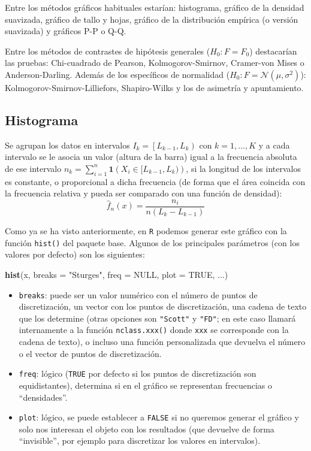 \documentclass[
]{book}
\newenvironment{Shaded}{\begin{snugshade}}{\end{snugshade}}
\newcommand{\DataTypeTok}[1]{\textcolor[rgb]{0.13,0.29,0.53}{#1}}
\newcommand{\KeywordTok}[1]{\textcolor[rgb]{0.13,0.29,0.53}{\textbf{#1}}}
\newcommand{\NormalTok}[1]{#1}
\newcommand{\OtherTok}[1]{\textcolor[rgb]{0.56,0.35,0.01}{#1}}
\newcommand{\StringTok}[1]{\textcolor[rgb]{0.31,0.60,0.02}{#1}}
\theoremstyle{break}
\theoremstyle{definition}
\theoremstyle{definition}
\theoremstyle{definition}
\theoremstyle{remark}
\begin{document}
Entre los métodos gráficos habituales estarían: histograma, gráfico de la densidad suavizada, gráfico de tallo y hojas, gráfico de la distribución empírica (o versión suavizada) y gráficos P-P o Q-Q.

Entre los métodos de contrastes de hipótesis generales (\(H_0:F=F_0\)) destacarían las pruebas: Chi-cuadrado de Pearson, Kolmogorov-Smirnov, Cramer-von Mises o Anderson-Darling.
Además de los específicos de normalidad (\(H_0:F= \mathcal{N}(\mu,\sigma^2)\)): Kolmogorov-Smirnov-Lilliefors, Shapiro-Wilks y los de asimetría y apuntamiento.

\hypertarget{histograma}{%
\subsection{Histograma}\label{histograma}}

Se agrupan los datos en intervalos \(I_{k}=\left[ L_{k-1},L_{k}\right)\) con \(k=1, \ldots, K\) y a cada intervalo se le asocia un valor (altura de la barra) igual a la frecuencia absoluta de ese intervalo \(n_k = \sum_{i=1}^{n}\mathbf{1}\left( X_i \in [L_{k-1},L_{k}) \right)\), si la longitud de los intervalos es constante, o proporcional a dicha frecuencia (de forma que el área coincida con la frecuencia relativa y pueda ser comparado con una función de densidad):
\[\hat{f}_n(x)=\frac{n_{i}}{n\left(  L_{k}-L_{k-1}\right)}\]

Como ya se ha visto anteriormente, en \texttt{R} podemos generar este gráfico con la función \texttt{hist()} del paquete base.
Algunos de los principales parámetros (con los valores por defecto) son los siguientes:

\begin{Shaded}
\begin{Highlighting}[]
\KeywordTok{hist}\NormalTok{(x, }\DataTypeTok{breaks =} \StringTok{"Sturges"}\NormalTok{, }\DataTypeTok{freq =} \OtherTok{NULL}\NormalTok{, }\DataTypeTok{plot =} \OtherTok{TRUE}\NormalTok{, ...)}
\end{Highlighting}
\end{Shaded}

\begin{itemize}
\item
  \texttt{breaks}: puede ser un valor numérico con el número de puntos de discretización, un vector con los puntos de discretización, una cadena de texto que los determine (otras opciones son \texttt{"Scott"} y \texttt{"FD"}; en este caso llamará internamente a la función \texttt{nclass.xxx()} donde \texttt{xxx} se corresponde con la cadena de texto), o incluso una función personalizada que devuelva el número o el vector de puntos de discretización.
\item
  \texttt{freq}: lógico (\texttt{TRUE} por defecto si los puntos de discretización son equidistantes), determina si en el gráfico se representan frecuencias o ``densidades''.
\item
  \texttt{plot}: lógico, se puede establecer a \texttt{FALSE} si no queremos generar el gráfico y solo nos interesan el objeto con los resultados (que devuelve de forma ``invisible'', por ejemplo para discretizar los valores en intervalos).
\end{itemize}
\end{document}
